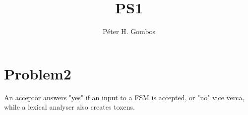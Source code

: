 \documentclass{article}
\title{PS1}
\author{Péter H. Gombos}
\begin{document}
\maketitle
\section{Problem2}
An acceptor answers "yes" if an input to a FSM is accepted, or "no" vice verca, while a lexical analyser also creates toxens.
\end{document}
